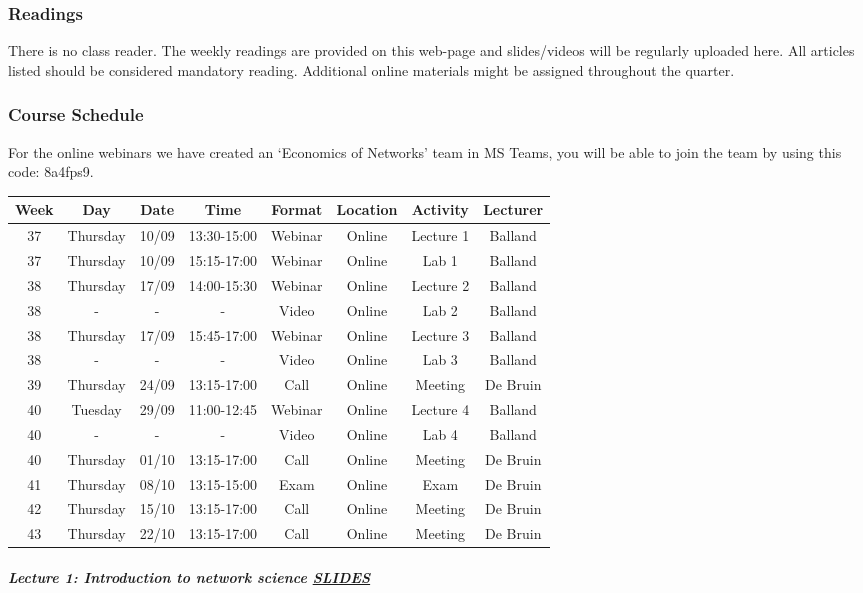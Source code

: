 \documentclass[
]{article}
\begin{document}
\hypertarget{readings}{%
\subsubsection{Readings}\label{readings}}

There is no class reader. The weekly readings are provided on this
web-page and slides/videos will be regularly uploaded here. All articles
listed should be considered mandatory reading. Additional online
materials might be assigned throughout the quarter.

\hypertarget{course-schedule}{%
\subsubsection{Course Schedule}\label{course-schedule}}

For the online webinars we have created an `Economics of Networks' team
in MS Teams, you will be able to join the team by using this code:
8a4fps9.

\begin{longtable}[]{@{}cccccccc@{}}
\toprule
Week & Day & Date & Time & Format & Location & Activity &
Lecturer\tabularnewline
\midrule
\endhead
37 & Thursday & 10/09 & 13:30-15:00 & Webinar & Online & Lecture 1 &
Balland\tabularnewline
37 & Thursday & 10/09 & 15:15-17:00 & Webinar & Online & Lab 1 &
Balland\tabularnewline
38 & Thursday & 17/09 & 14:00-15:30 & Webinar & Online & Lecture 2 &
Balland\tabularnewline
38 & - & - & - & Video & Online & Lab 2 & Balland\tabularnewline
38 & Thursday & 17/09 & 15:45-17:00 & Webinar & Online & Lecture 3 &
Balland\tabularnewline
38 & - & - & - & Video & Online & Lab 3 & Balland\tabularnewline
39 & Thursday & 24/09 & 13:15-17:00 & Call & Online & Meeting & De
Bruin\tabularnewline
40 & Tuesday & 29/09 & 11:00-12:45 & Webinar & Online & Lecture 4 &
Balland\tabularnewline
40 & - & - & - & Video & Online & Lab 4 & Balland\tabularnewline
40 & Thursday & 01/10 & 13:15-17:00 & Call & Online & Meeting & De
Bruin\tabularnewline
41 & Thursday & 08/10 & 13:15-15:00 & Exam & Online & Exam & De
Bruin\tabularnewline
42 & Thursday & 15/10 & 13:15-17:00 & Call & Online & Meeting & De
Bruin\tabularnewline
43 & Thursday & 22/10 & 13:15-17:00 & Call & Online & Meeting & De
Bruin\tabularnewline
\bottomrule
\end{longtable}

\hypertarget{lecture-1-introduction-to-network-science-slides}{%
\subparagraph{\texorpdfstring{\textbf{Lecture 1: Introduction to network
science}
\href{https://github.com/PABalland/PABalland.github.io/raw/master/teaching/on/L1\&Lab1.pdf}{SLIDES}}{Lecture 1: Introduction to network science SLIDES}}\label{lecture-1-introduction-to-network-science-slides}}
\end{document}
